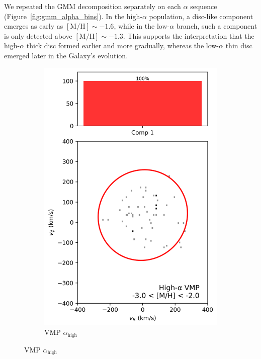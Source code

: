 \documentclass[a4paper,10pt]{article}
\begin{document}
\begin{multicols}{2}
We repeated the GMM decomposition separately on each $\alpha$ sequence (Figure~\ref{fig:gmm_alpha_bins}). 
In the high-$\alpha$ population, a disc-like component emerges as early as $\mathrm{[M/H]} \sim -1.6$, 
while in the low-$\alpha$ branch, such a component is only detected above $\mathrm{[M/H]} \sim -1.3$. 
This supports the interpretation that the high-$\alpha$ thick disc formed earlier and more gradually, 
whereas the low-$\alpha$ thin disc emerged later in the Galaxy’s evolution.

\begin{figure}[H]
  \centering
  \begin{subfigure}[t]{0.24\linewidth}
    \includegraphics[width=\linewidth]{../figures/gmm_vmp_high_alpha_k1.png}
    \caption{VMP $\alpha_{\mathrm{high}}$}
  \end{subfigure}

\end{figure}
\end{multicols}
\end{document}
